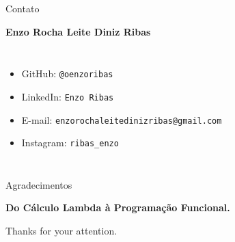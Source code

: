 \documentclass[aspectratio=169,11pt]{beamer}
\begin{document}
\begin{frame}{Contato}
    \begin{center}
        \Large\textbf{Enzo Rocha Leite Diniz Ribas}
    \end{center}
    
    \vspace{0.2cm}
    \begin{columns}[T]
        \begin{itemize}
        \item GitHub: \texttt{@oenzoribas}
        \item LinkedIn: \texttt{Enzo Ribas}
        \item E-mail: \texttt{enzorochaleitedinizribas@gmail.com}
        \item Instagram: \texttt{ribas\_enzo}
        \end{itemize}
    \end{columns}
\end{frame}

\begin{frame}{Agradecimentos}
  \begin{center}
    \Huge\textbf{Do Cálculo Lambda à Programação Funcional.}
  \end{center}

  \vfill
  \begin{center}
    \normalsize Thanks for your attention.
  \end{center}
\end{frame}
\end{document}
